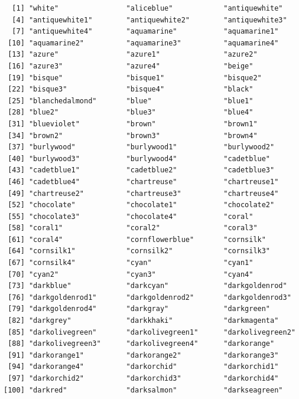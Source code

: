 \documentclass[a4paperpaper,]{article}
\theoremstyle{definition}
\theoremstyle{definition}
\theoremstyle{definition}
\theoremstyle{remark}
\begin{document}
\begin{verbatim}
  [1] "white"                "aliceblue"            "antiquewhite"        
  [4] "antiquewhite1"        "antiquewhite2"        "antiquewhite3"       
  [7] "antiquewhite4"        "aquamarine"           "aquamarine1"         
 [10] "aquamarine2"          "aquamarine3"          "aquamarine4"         
 [13] "azure"                "azure1"               "azure2"              
 [16] "azure3"               "azure4"               "beige"               
 [19] "bisque"               "bisque1"              "bisque2"             
 [22] "bisque3"              "bisque4"              "black"               
 [25] "blanchedalmond"       "blue"                 "blue1"               
 [28] "blue2"                "blue3"                "blue4"               
 [31] "blueviolet"           "brown"                "brown1"              
 [34] "brown2"               "brown3"               "brown4"              
 [37] "burlywood"            "burlywood1"           "burlywood2"          
 [40] "burlywood3"           "burlywood4"           "cadetblue"           
 [43] "cadetblue1"           "cadetblue2"           "cadetblue3"          
 [46] "cadetblue4"           "chartreuse"           "chartreuse1"         
 [49] "chartreuse2"          "chartreuse3"          "chartreuse4"         
 [52] "chocolate"            "chocolate1"           "chocolate2"          
 [55] "chocolate3"           "chocolate4"           "coral"               
 [58] "coral1"               "coral2"               "coral3"              
 [61] "coral4"               "cornflowerblue"       "cornsilk"            
 [64] "cornsilk1"            "cornsilk2"            "cornsilk3"           
 [67] "cornsilk4"            "cyan"                 "cyan1"               
 [70] "cyan2"                "cyan3"                "cyan4"               
 [73] "darkblue"             "darkcyan"             "darkgoldenrod"       
 [76] "darkgoldenrod1"       "darkgoldenrod2"       "darkgoldenrod3"      
 [79] "darkgoldenrod4"       "darkgray"             "darkgreen"           
 [82] "darkgrey"             "darkkhaki"            "darkmagenta"         
 [85] "darkolivegreen"       "darkolivegreen1"      "darkolivegreen2"     
 [88] "darkolivegreen3"      "darkolivegreen4"      "darkorange"          
 [91] "darkorange1"          "darkorange2"          "darkorange3"         
 [94] "darkorange4"          "darkorchid"           "darkorchid1"         
 [97] "darkorchid2"          "darkorchid3"          "darkorchid4"         
[100] "darkred"              "darksalmon"           "darkseagreen"        

\end{verbatim}
\end{document}
